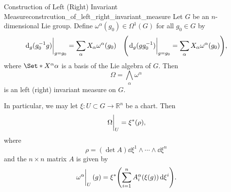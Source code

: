 \documentclass{article}
\begin{document}
\begin{theorem}{Construction of Left (Right) Invariant Measure}{constrcution_of_left_right_invariant_measure}
    Let $G$ be an $n$-dimensional Lie group.
    Define $\omega^\alpha(g_0)\in \Omega^1(G)$ for all $g_0\in G$ by
    \[ \eval{\dd_g(g_0^{-1}g)}_{g = g_0} = \sum_{\alpha} X_\alpha \omega^\alpha(g_0) \quad \qty(\eval{\dd_g(g g_0^{-1})}_{g = g_0} = \sum_{\alpha} X_\alpha \omega^\alpha(g_0)), \]
    where $\Set*{X^\alpha}{\alpha}$ is a basis of the Lie algebra of $G$.
    Then
    \[ \Omega = \bigwedge_{\alpha} \omega^\alpha \]
    is an left (right) invariant measure on $G$.
\end{theorem}

In particular, we may let $\xi: U\subset G \rightarrow \mathbb{R}^n$ be a chart.
Then
\[ \eval{\Omega}_U = \xi^*(\rho), \]
where
\[ \rho = (\det A) \dd \xi^1 \wedge \cdots \wedge \dd \xi^n \]
and the $n\times n$ matrix $A$ is given by
\[ \eval{\omega^\alpha}_U(g) = \xi^*\qty(\sum_{i=1}^n A^\alpha_i(\xi(g)) \dd{\xi^i}). \]

% 
% 
\end{document}
